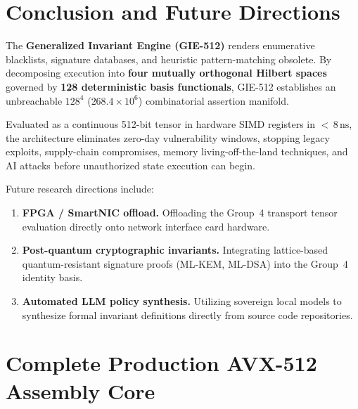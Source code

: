 \documentclass{portalciencia}
\theoremstyle{plain}
\theoremstyle{definition}
\begin{document}
\section{Conclusion and Future Directions}

The \textbf{Generalized Invariant Engine (GIE-512)} renders enumerative blacklists, signature databases, and heuristic pattern-matching obsolete. By decomposing execution into \textbf{four mutually orthogonal Hilbert spaces} governed by \textbf{128 deterministic basis functionals}, GIE-512 establishes an unbreachable $128^{4}$ ($268.4 \times 10^{6}$) combinatorial assertion manifold.

Evaluated as a continuous 512-bit tensor in hardware SIMD registers in ${<}\,8\,\mathrm{ns}$, the architecture eliminates zero-day vulnerability windows, stopping legacy exploits, supply-chain compromises, memory living-off-the-land techniques, and AI attacks before unauthorized state execution can begin.

Future research directions include:
\begin{enumerate}
  \item \textbf{FPGA / SmartNIC offload.} Offloading the Group~4 transport tensor evaluation directly onto network interface card hardware.
  \item \textbf{Post-quantum cryptographic invariants.} Integrating lattice-based quantum-resistant signature proofs (ML-KEM, ML-DSA) into the Group~4 identity basis.
  \item \textbf{Automated LLM policy synthesis.} Utilizing sovereign local models to synthesize formal invariant definitions directly from source code repositories.
\end{enumerate}

\appendix

\section{Complete Production AVX-512 Assembly Core}
\end{document}
